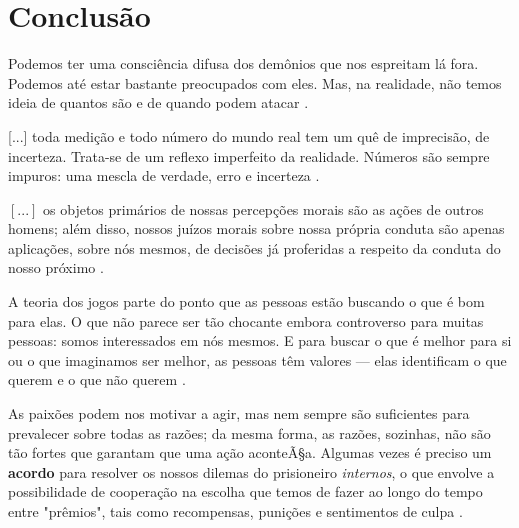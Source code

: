 \documentclass[
	article,			        %
	11pt,				          %
	oneside,			        %
	a4paper,			        %
	english,			        %
	brazil,				        %
	sumario=tradicional
]{abntex2}\usepackage[]{graphicx}\usepackage[]{color}
\begin{document}
% 

\section{Conclusão}
\label{sec:conclusao}

\begin{citacao}
  Podemos ter uma consciência difusa dos demônios que nos espreitam lá fora. Podemos até estar bastante preocupados com eles. Mas, na realidade, não temos ideia de quantos são e de quando podem atacar \cite{Nate.2012}.
\end{citacao}

\begin{citacao}

[...] toda medição e todo número do mundo real tem um quê de imprecisão, de incerteza. Trata-se de um reflexo imperfeito da realidade. Números são sempre impuros: uma mescla de verdade, erro e incerteza \cite{Seife.2012}.

\end{citacao}


\begin{citacao}
$\left [ ... \right ]$ os objetos primários de nossas percepções morais são as ações de outros homens; além disso, nossos juízos morais sobre nossa própria conduta são apenas aplicações, sobre nós mesmos, de decisões já proferidas a respeito da conduta do nosso próximo \cite{Smith.1999}.
\end{citacao}

\begin{citacao}
  A teoria dos jogos parte do ponto que as pessoas estão buscando o que é bom para elas. O que não parece ser tão chocante embora controverso para muitas pessoas: somos interessados em nós mesmos. E para buscar o que é melhor para si ou o que imaginamos ser melhor, as pessoas têm valores --- elas identificam o que querem e o que não querem \cite[min.~2:17--2:37]{MesquitaTED.2009}. 
\end{citacao}


\begin{citacao}
As paixões podem nos motivar a agir, mas nem sempre são suficientes para prevalecer sobre todas as razões; da mesma forma, as razões, sozinhas, não são tão fortes que garantam que uma ação aconteÃ§a. Algumas vezes é preciso um \textbf{acordo} para resolver os nossos dilemas do prisioneiro \emph{internos}, o que envolve a possibilidade de cooperação na escolha que temos de fazer ao longo do tempo entre "prêmios", tais como recompensas, punições e sentimentos de culpa \cite[p.~132]{Pimentel.2007}.
\end{citacao}
\end{document}
